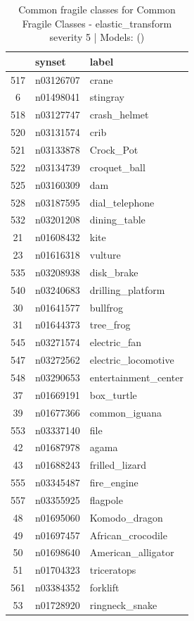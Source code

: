 \begin{table}
\caption{Common fragile classes for Common Fragile Classes - elastic_transform severity 5 | Models: ()}
\label{tab:Common Fragile Classes - elastic_transform severity 5_d41d8cd9}
\begin{tabular}{cll}
\toprule
 & synset & label \\
\midrule
517 & n03126707 & crane \\
6 & n01498041 & stingray \\
518 & n03127747 & crash_helmet \\
520 & n03131574 & crib \\
521 & n03133878 & Crock_Pot \\
522 & n03134739 & croquet_ball \\
525 & n03160309 & dam \\
528 & n03187595 & dial_telephone \\
532 & n03201208 & dining_table \\
21 & n01608432 & kite \\
23 & n01616318 & vulture \\
535 & n03208938 & disk_brake \\
540 & n03240683 & drilling_platform \\
30 & n01641577 & bullfrog \\
31 & n01644373 & tree_frog \\
545 & n03271574 & electric_fan \\
547 & n03272562 & electric_locomotive \\
548 & n03290653 & entertainment_center \\
37 & n01669191 & box_turtle \\
39 & n01677366 & common_iguana \\
553 & n03337140 & file \\
42 & n01687978 & agama \\
43 & n01688243 & frilled_lizard \\
555 & n03345487 & fire_engine \\
557 & n03355925 & flagpole \\
48 & n01695060 & Komodo_dragon \\
49 & n01697457 & African_crocodile \\
50 & n01698640 & American_alligator \\
51 & n01704323 & triceratops \\
561 & n03384352 & forklift \\
53 & n01728920 & ringneck_snake \\

\end{tabular}
\end{table}
